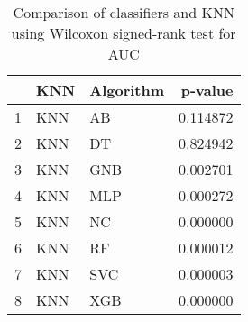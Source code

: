 \begin{table}
\footnotesize
\caption{Comparison of classifiers and KNN using Wilcoxon signed-rank test for AUC}
\label{tab:KNN wilcoxon AUC comparison}
\begin{tabular}{lllr}
\hline
 & KNN & Algorithm & p-value \\
\hline
1 & KNN & AB & 0.114872 \\
2 & KNN & DT & 0.824942 \\
3 & KNN & GNB & 0.002701 \\
4 & KNN & MLP & 0.000272 \\
5 & KNN & NC & 0.000000 \\
6 & KNN & RF & 0.000012 \\
7 & KNN & SVC & 0.000003 \\
8 & KNN & XGB & 0.000000 \\
\hline
\end{tabular}
\end{table}
